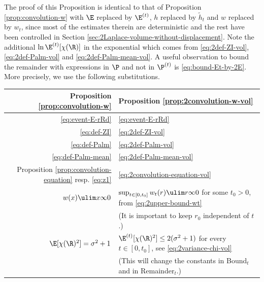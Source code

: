 \documentclass[10pt,a4paper]{article}
\begin{document}

The proof of this Proposition is identical to that of Proposition \ref{prop:convolution-w} with $\E$ replaced by $\E^{(t)}$, $h$ replaced by $\tilde h_t$ and $w$ replaced by $w_t$, since most of the estimates therein are deterministic and the rest have been controlled in Section \ref{sec:2Laplace-volume-without-displacement}. Note the additional $\ln\E^{(t)}[\chi(\R)]$ in the exponential which comes from \eqref{eq:2def-ZI-vol}, \eqref{eq:2def-Palm-vol} and \eqref{eq:2def-Palm-mean-vol}. A useful observation to bound the remainder with expressions in $\P$ and not in $\P^{(t)}$ is \eqref{eq:bound-Et-by-2E}. %
More precisely, we use the following substitutions.


\begin{center}
\begin{tabular}{|r|l|}
\hline
Proposition \ref{prop:convolution-w} & Proposition \ref{prop:2convolution-w-vol} \\
\hline
\eqref{eq:event-E-rRd} & \eqref{eq:event-E-rRd} \\ \hline
\eqref{eq:def-ZI} & \eqref{eq:2def-ZI-vol} \\ \hline
\eqref{eq:def-Palm} & \eqref{eq:2def-Palm-vol} \\ \hline
\eqref{eq:def-Palm-mean} & \eqref{eq:2def-Palm-mean-vol} \\ \hline
Proposition \ref{prop:convolution-equation} resp. \eqref{eq:z1} & \eqref{eq:2convolution-equation-vol} \\ \hline
$w(x) \ulim x \infty 0$ & $\sup_{t \in [0,t_0]} w_{t}(r) \ulim r \infty 0$ for some $t_0>0$, from \eqref{eq:2upper-bound-wt} \\
& (It is important to keep $r_0$ independent of $t$.) \\ \hline
$\E[\chi(\R)^2] = \sigma^2+1$ & $\E^{(t)}[\chi(\R)^2] \leq 2(\sigma^2+1)$ for every $t\in [0,t_0]$, see \eqref{eq:2variance-chi-vol} \\
& (This will change the constants in Bound$_t$ and in Remainder$_t$.)\\
\hline
\end{tabular}
\end{center}
\end{document}

